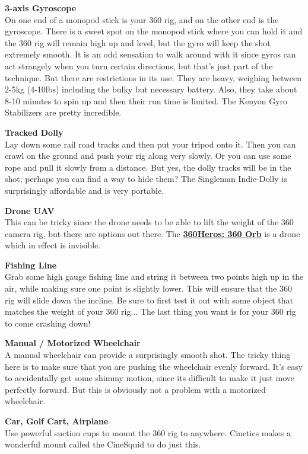 \begin{fullwidth}
{\bf 3-axis Gyroscope}
\\
On one end of a monopod stick is your 360 rig, and on the other end is the gyroscope. There is a sweet spot on the monopod stick where you can hold it and the 360 rig will remain high up and level, but the gyro will keep the shot extremely smooth. It is an odd sensation to walk around with it since gyros can act strangely when you turn certain directions, but that's just part of the technique. But there are restrictions in its use. They are heavy, weighing between 2-5kg (4-10lbs) including the bulky but necessary battery. Also, they take about 8-10 minutes to spin up and then their run time is limited. The Kenyon Gyro Stabilizers are pretty incredible.

{\bf Tracked Dolly}
\\
Lay down some rail road tracks and then put your tripod onto it. Then you can crawl on the ground and push your rig along very slowly. Or you can use some rope and pull it slowly from a distance. But yes, the dolly tracks will be in the shot; perhaps you can find a way to hide them? The Singleman Indie-Dolly is surprisingly affordable and is very portable. 

{\bf Drone UAV}
\\
This can be tricky since the drone needs to be able to lift the weight of the 360 camera rig, but there are options out there. The \textbf{\href{http://youtu.be/-5iUZybKXr0}{360Heros: 360 Orb}} is a drone which in effect is invisible.

{\bf Fishing Line}
\\
Grab some high gauge fishing line and string it between two points high up in the air, while making sure one point is slightly lower. This will ensure that the 360 rig will slide down the incline. Be sure to first test it out with some object that matches the weight of your 360 rig... The last thing you want is for your 360 rig to come crashing down!

{\bf Manual / Motorized Wheelchair}
\\
A manual wheelchair can provide a surprisingly smooth shot. The tricky thing here is to make sure that you are pushing the wheelchair evenly forward. It's easy to accidentally get some shimmy motion, since its difficult to make it just move perfectly forward. But this is obviously not a problem with a motorized wheelchair. 

{\bf Car, Golf Cart, Airplane}
\\
Use powerful suction cups to mount the 360 rig to anywhere. Cinetics makes a wonderful mount called the CineSquid to do just this.





\clearpage
\end{fullwidth}
